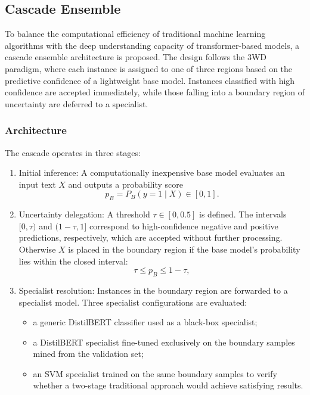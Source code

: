 \documentclass[a4paper,fleqn]{cas-dc}
\newcommand{\inputtext}{X}
\newcommand{\predVal}{y}
\newcommand{\mBase}{B}
\newcommand{\thresh}{\tau}
\newcommand{\probSmall}[1]{p_{#1}}
\newcommand{\probLarge}[2]{P_{#1}(\predVal=1 \mid #2)}
\begin{document}
\subsection{Cascade Ensemble} \label{sec:cascade}

To balance the computational efficiency of traditional machine learning algorithms with the deep understanding capacity of transformer-based models, a cascade ensemble architecture is proposed. The design follows the 3WD paradigm, where each instance is assigned to one of three regions based on the predictive confidence of a lightweight base model. Instances classified with high confidence are accepted immediately, while those falling into a boundary region of uncertainty are deferred to a specialist.

\subsubsection{Architecture} \label{sec:cascade_architecture}

The cascade operates in three stages:

\begin{enumerate}
	\item {Initial inference:} A computationally inexpensive base model evaluates an input text $\inputtext$ and outputs a probability score
	\begin{equation}
		\probSmall{\mBase} = \probLarge{\mBase}{\inputtext} \in [0,1].
	\end{equation}
	
	\item {Uncertainty delegation:} A threshold $\thresh \in [0, 0.5]$ is defined. The intervals $[0, \thresh)$ and $(1-\thresh, 1]$ correspond to high-confidence negative and positive predictions, respectively, which are accepted without further processing. Otherwise $\inputtext$ is placed in the boundary region if the base model's probability lies within the closed interval:
	\begin{equation}
		\thresh \le \probSmall{\mBase} \le 1 - \thresh,
	\end{equation}
	
	\item {Specialist resolution:} Instances in the boundary region are forwarded to a specialist model. Three specialist configurations are evaluated:
	\begin{itemize}
		\item a generic DistilBERT classifier used as a black-box specialist;
		\item a DistilBERT specialist fine-tuned exclusively on the boundary samples mined from the validation set;
		\item an SVM specialist trained on the same boundary samples to verify whether a two-stage traditional approach would achieve satisfying results.
	\end{itemize}
\end{enumerate}
\end{document}
